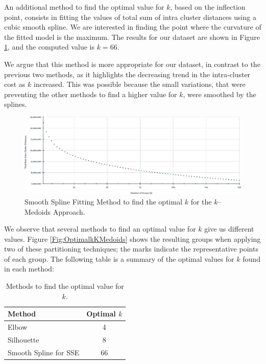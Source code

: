 An additional method to find the optimal value for $k$, based on the inflection point, consists in fitting the values of total sum of intra cluster distances using a cubic smooth spline. We are interested in finding the point where the curvature of the fitted model is the maximum. The results for our dataset are shown in Figure \ref{Fig:SmoothSpline-kMedoids}, and the computed value is $k = 66$.

We argue that this method is more appropriate for our dataset, in contrast to the previous two methods, as it highlights the decreasing trend in the intra-cluster cost as $k$ increased. This was possible because the small variations, that were preventing the other methods to find a higher value for $k$, were smoothed by the splines.

\begin{figure}[h]
	\centering
	\includegraphics[scale=0.5]{../Figures/SmoothSpline-kMedoids}
	\caption{Smooth Spline Fitting Method to find the optimal $k$ for the $k$--Medoids Approach.}
	\label{Fig:SmoothSpline-kMedoids}
\end{figure}

We observe that several methods to find an optimal value for $k$ give us different values. Figure \ref{Fig:OptimalkKMedoids} shows the resulting groups when applying two of these partitioning techniques; the marks indicate the representative points of each group. %
The following table is a summary of the optimal values for $k$ found in each method:
\begin{table}[h]
	\centering
	\tiny
	\begin{tabular}{|l|c|}
		\hline
		Method & Optimal $k$ \\ \hline
		Elbow  & 4	\\
		Silhouette & 8	\\
		Smooth Spline for SSE & 66\\ \hline
	\end{tabular}
\caption{Methods to find the optimal value for $k$.}
\label{Table:ValidationIndex}
\end{table}
		
